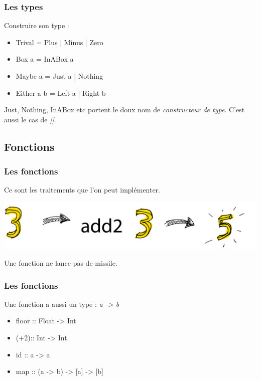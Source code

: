 \documentclass{beamer}
\begin{document}
\begin{frame}
\frametitle{Les types}
\begin{block}{Construire son type :}
\begin{itemize}
\item Trival = Plus | Minus | Zero
\pause
\item Box a = InABox a
\pause
\item Maybe a = Just a | Nothing
\pause
\item Either a b = Left a | Right b
\end{itemize}
\end{block}

\pause

Just, Nothing, InABox etc portent le doux nom de \emph{constructeur de type}. C'est aussi le cas de \emph{[]}.
\end{frame}

\subsection{Fonctions}
\begin{frame}
\frametitle{Les fonctions}
\begin{block}{}
Ce sont les traitements que l'on peut implémenter.
\end{block}
\begin{center}
\includegraphics[scale=0.2]{fct.png}
\end{center}
\pause
\begin{block}{}
Une fonction ne lance pas de missile.
\end{block}
\end{frame}


\begin{frame}
\frametitle{Les fonctions}
\begin{block}{Une fonction a aussi un type : \emph{a -> b}}
\begin{itemize}
\item floor   :: Float -> Int
\item (+2):: Int -> Int
\pause
\item id      :: a -> a
\item map :: (a -> b) -> [a] -> [b]
\end{itemize}
\end{block}

\end{frame}
\end{document}
